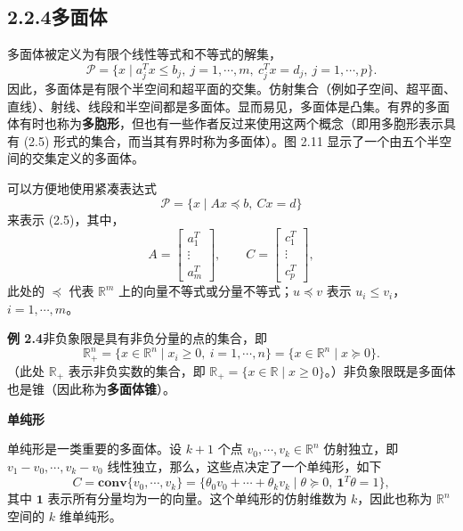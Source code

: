 \documentclass[UTF8, 12pt, fontset=fandol, oneside]{ctexart}
\begin{document}
\subsection*{2.2.4\quad 多面体}

多面体被定义为有限个线性等式和不等式的解集，
\begin{equation}
  \mathcal{P}=\{x\mid a_j^Tx\le b_j,\ j=1,\cdots,m,\ c_j^Tx=d_j,\ j=1,\cdots,p\}.
  \tag{2.5}
\end{equation}
因此，多面体是有限个半空间和超平面的交集。仿射集合（例如子空间、超平面、直线）、射线、线段和半空间都是多面体。显而易见，多面体是凸集。有界的多面体有时也称为\textbf{多胞形}，但也有一些作者反过来使用这两个概念（即用多胞形表示具有 (2.5) 形式的集合，而当其有界时称为多面体）。图 2.11 显示了一个由五个半空间的交集定义的多面体。

可以方便地使用紧凑表达式
\begin{equation}
  \mathcal{P}=\{x\mid Ax\preceq b,\ Cx=d\}
  \tag{2.6}
\end{equation}
来表示 (2.5)，其中，
\[
  A=
  \begin{bmatrix}
    a_1^T\\
    \vdots\\
    a_m^T
  \end{bmatrix},
  \qquad
  C=
  \begin{bmatrix}
    c_1^T\\
    \vdots\\
    c_p^T
  \end{bmatrix},
\]
此处的 $\preceq$ 代表 $\mathbb{R}^m$ 上的向量不等式或分量不等式；$u\preceq v$ 表示 $u_i\le v_i$，$i=1,\cdots,m$。

\noindent\textbf{例 2.4}\quad 非负象限是具有非负分量的点的集合，即
\[
  \mathbb{R}_+^n=\{x\in\mathbb{R}^n\mid x_i\ge 0,\ i=1,\cdots,n\}
  =\{x\in\mathbb{R}^n\mid x\succeq 0\}.
\]
（此处 $\mathbb{R}_+$ 表示非负实数的集合，即 $\mathbb{R}_+=\{x\in\mathbb{R}\mid x\ge 0\}$。）非负象限既是多面体也是锥（因此称为\textbf{多面体锥}）。

\noindent\textbf{单纯形}

单纯形是一类重要的多面体。设 $k+1$ 个点 $v_0,\cdots,v_k\in\mathbb{R}^n$ 仿射独立，即 $v_1-v_0,\cdots,v_k-v_0$ 线性独立，那么，这些点决定了一个单纯形，如下
\begin{equation}
  C=\mathbf{conv}\{v_0,\cdots,v_k\}
  =\{\theta_0v_0+\cdots+\theta_kv_k\mid \theta\succeq 0,\ \mathbf{1}^T\theta=1\},
  \tag{2.7}
\end{equation}
其中 $\mathbf{1}$ 表示所有分量均为一的向量。这个单纯形的仿射维数为 $k$，因此也称为 $\mathbb{R}^n$ 空间的 $k$ 维单纯形。
\end{document}
